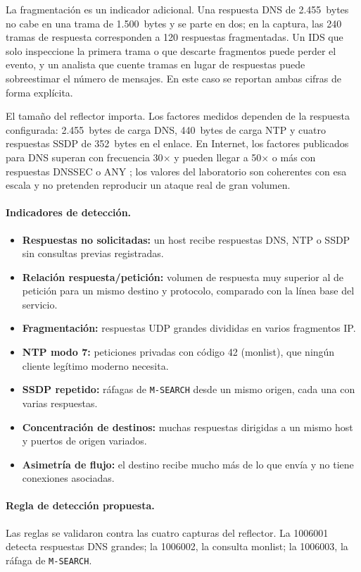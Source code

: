 La fragmentación es un indicador adicional. Una respuesta DNS de 2.455~bytes no cabe en una trama de 1.500~bytes y se parte en dos; en la captura, las 240 tramas de respuesta corresponden a 120 respuestas fragmentadas. Un IDS que solo inspeccione la primera trama o que descarte fragmentos puede perder el evento, y un analista que cuente tramas en lugar de respuestas puede sobreestimar el número de mensajes. En este caso se reportan ambas cifras de forma explícita.

El tamaño del reflector importa. Los factores medidos dependen de la respuesta configurada: 2.455~bytes de carga DNS, 440~bytes de carga NTP y cuatro respuestas SSDP de 352~bytes en el enlace. En Internet, los factores publicados para DNS superan con frecuencia 30$\times$ y pueden llegar a 50$\times$ o más con respuestas DNSSEC o ANY \parencite{nawrocki2021farside}; los valores del laboratorio son coherentes con esa escala y no pretenden reproducir un ataque real de gran volumen.

\paragraph{Indicadores de detección.}
\begin{itemize}
	\item \textbf{Respuestas no solicitadas:} un host recibe respuestas DNS, NTP o SSDP sin consultas previas registradas.
	\item \textbf{Relación respuesta/petición:} volumen de respuesta muy superior al de petición para un mismo destino y protocolo, comparado con la línea base del servicio.
	\item \textbf{Fragmentación:} respuestas UDP grandes divididas en varios fragmentos IP.
	\item \textbf{NTP modo 7:} peticiones privadas con código 42 (monlist), que ningún cliente legítimo moderno necesita.
	\item \textbf{SSDP repetido:} ráfagas de \texttt{M-SEARCH} desde un mismo origen, cada una con varias respuestas.
	\item \textbf{Concentración de destinos:} muchas respuestas dirigidas a un mismo host y puertos de origen variados.
	\item \textbf{Asimetría de flujo:} el destino recibe mucho más de lo que envía y no tiene conexiones asociadas.
\end{itemize}

\paragraph{Regla de detección propuesta.}
Las reglas se validaron contra las cuatro capturas del reflector. La 1006001 detecta respuestas DNS grandes; la 1006002, la consulta monlist; la 1006003, la ráfaga de \texttt{M-SEARCH}.

